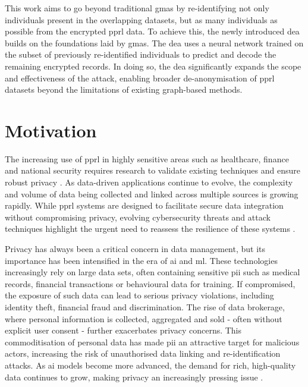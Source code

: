 This work aims to go beyond traditional \ac{gma}s by re-identifying not only individuals present in the overlapping datasets, but as many individuals as possible from the encrypted \ac{pprl} data. 
To achieve this, the newly introduced \ac{dea} builds on the foundations laid by \ac{gma}s. 
The \ac{dea} uses a neural network trained on the subset of previously re-identified individuals to predict and decode the remaining encrypted records. 
In doing so, the \ac{dea} significantly expands the scope and effectiveness of the attack, enabling broader de-anonymisation of \ac{pprl} datasets beyond the limitations of existing graph-based methods.

\section{Motivation} \label{sec:motivation}

The increasing use of \ac{pprl} in highly sensitive areas such as healthcare, finance and national security requires research to validate existing techniques and ensure robust privacy \cite{schnell2009privacy}. 
As data-driven applications continue to evolve, the complexity and volume of data being collected and linked across multiple sources is growing rapidly. 
While \ac{pprl} systems are designed to facilitate secure data integration without compromising privacy, evolving cybersecurity threats and attack techniques highlight the urgent need to reassess the resilience of these systems \cite{vatsalan2017privacy}.

Privacy has always been a critical concern in data management, but its importance has been intensified in the era of \ac{ai} and \ac{ml}. 
These technologies increasingly rely on large data sets, often containing sensitive \ac{pii} such as medical records, financial transactions or behavioural data for training. If compromised, the exposure of such data can lead to serious privacy violations, including identity theft, financial fraud and discrimination. 
The rise of data brokerage, where personal information is collected, aggregated and sold - often without explicit user consent - further exacerbates privacy concerns. 
This commoditisation of personal data has made \ac{pii} an attractive target for malicious actors, increasing the risk of unauthorised data linking and re-identification attacks.
As \ac{ai} models become more advanced, the demand for rich, high-quality data continues to grow, making privacy an increasingly pressing issue \cite{king2024rethinking, manheim2019artificial}.

